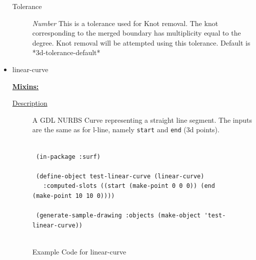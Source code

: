 \documentclass [11pt]{book}
\begin{document}
\begin{itemize}
\begin{description}
\item [Tolerance]
\emph{Number} This is a tolerance used for Knot removal.  The knot corresponding to the merged boundary has multiplicity equal to the degree. Knot removal will be attempted using this tolerance. Default is *3d-tolerance-default*


\end{description}







\item {}linear-curve


\textbf{
\underline{Mixins:}} %





\begin{description}

\item [
\underline{Description}]


A GDL NURBS Curve representing a straight line segment. The inputs are the same as
for l-line, namely \texttt{start} and \texttt{end} (3d points).



\end{description}




\begin{figure}
\begin{lrbox}{\boxedverb}
\begin{minipage}{\linewidth}
{\small

\begin{verbatim}

 (in-package :surf)

 (define-object test-linear-curve (linear-curve)
   :computed-slots ((start (make-point 0 0 0)) (end (make-point 10 10 0))))
  
 (generate-sample-drawing :objects (make-object 'test-linear-curve))


\end{verbatim}}
\end{minipage}
\end{lrbox}
\fbox{\usebox{\boxedverb}}

\caption{Example Code for linear-curve}

\label{fig:example-code-linear-curve}

\end{figure}


\end{itemize}
\end{document}
